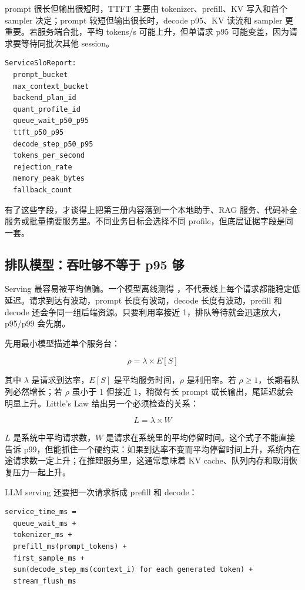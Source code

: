prompt 很长但输出很短时，TTFT 主要由 tokenizer、prefill、KV 写入和首个 sampler 决定；prompt 较短但输出很长时，decode p95、KV 读流和 sampler 更重要。若服务端合批，平均 tokens/s 可能上升，但单请求 p95 可能变差，因为请求要等待同批次其他 session。

\begin{lstlisting}[numbers=none,caption={业务 SLO 报告字段}]
ServiceSloReport:
  prompt_bucket
  max_context_bucket
  backend_plan_id
  quant_profile_id
  queue_wait_p50_p95
  ttft_p50_p95
  decode_step_p50_p95
  tokens_per_second
  rejection_rate
  memory_peak_bytes
  fallback_count
\end{lstlisting}

有了这些字段，才谈得上把第三册内容落到一个本地助手、RAG 服务、代码补全服务或批量摘要服务里。不同业务目标会选择不同 profile，但底层证据字段是同一套。

\subsection{排队模型：吞吐够不等于 p95 够}

Serving 最容易被平均值骗。一个模型离线测得 ，不代表线上每个请求都能稳定低延迟。请求到达有波动，prompt 长度有波动，decode 长度有波动，prefill 和 decode 还会争同一组后端资源。只要利用率接近 1，排队等待就会迅速放大，p95/p99 会先崩。

先用最小模型描述单个服务台：

\[
\rho = \lambda \times E[S]
\]

其中 \(\lambda\) 是请求到达率，\(E[S]\) 是平均服务时间，\(\rho\) 是利用率。若 \(\rho \ge 1\)，长期看队列必然增长；若 \(\rho\) 虽小于 1 但接近 1，稍微有长 prompt 或长输出，尾延迟就会明显上升。Little's Law 给出另一个必须检查的关系：

\[
L = \lambda \times W
\]

\(L\) 是系统中平均请求数，\(W\) 是请求在系统里的平均停留时间。这个式子不能直接告诉 p99，但能抓住一个硬约束：如果到达率不变而平均停留时间上升，系统内在途请求数一定上升；在推理服务里，这通常意味着 KV cache、队列内存和取消恢复压力一起上升。

LLM serving 还要把一次请求拆成 prefill 和 decode：

\begin{lstlisting}[numbers=none,caption={请求服务时间的最小拆分}]
service_time_ms =
  queue_wait_ms +
  tokenizer_ms +
  prefill_ms(prompt_tokens) +
  first_sample_ms +
  sum(decode_step_ms(context_i) for each generated token) +
  stream_flush_ms
\end{lstlisting}

